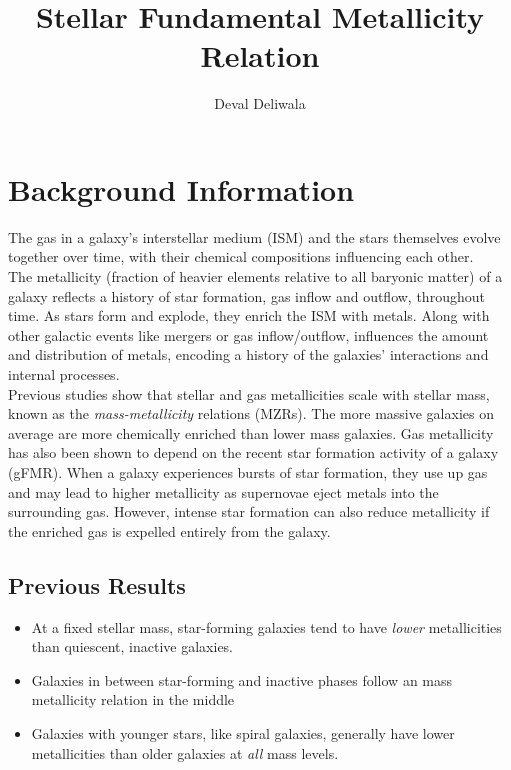 \documentclass[svgnames]{article}     %
\title{Stellar Fundamental Metallicity Relation}
\author{Deval Deliwala}
\begin{document}
\maketitle

\section{Background Information}


The gas in a galaxy's interstellar medium (ISM) and the stars themselves evolve
together over time, with their chemical compositions influencing each other. \\

The metallicity (fraction of heavier elements relative to all baryonic matter)
of a galaxy reflects a history of star formation, gas inflow and outflow,
throughout time. As stars form and explode, they enrich the ISM with metals.
Along with other galactic events like mergers or gas inflow/outflow,
influences the amount and distribution of metals, encoding a history of the
galaxies' interactions and internal processes.\\

Previous studies show that stellar and gas metallicities scale with stellar
mass, known as the \textit{mass-metallicity} relations (MZRs). The more massive
galaxies on average are more chemically enriched than lower mass galaxies. Gas
metallicity has also been shown to depend on the recent star formation
activity of a galaxy (gFMR). When a galaxy experiences bursts of star formation, they
use up gas and may lead to higher metallicity as supernovae eject metals into
the surrounding gas. However, intense star formation can also reduce
metallicity if the enriched gas is expelled entirely from the galaxy. 

\subsection{Previous Results}

\begin{itemize}
  \item At a fixed stellar mass, star-forming galaxies tend to have
    \textit{lower} metallicities than quiescent, inactive galaxies. 
  \item Galaxies in between star-forming and inactive phases follow an
    mass metallicity  relation in the middle 
  \item Galaxies with younger stars, like spiral galaxies, generally have lower
    metallicities than older galaxies at \textit{all} mass levels. 
\end{itemize}
\end{document}
